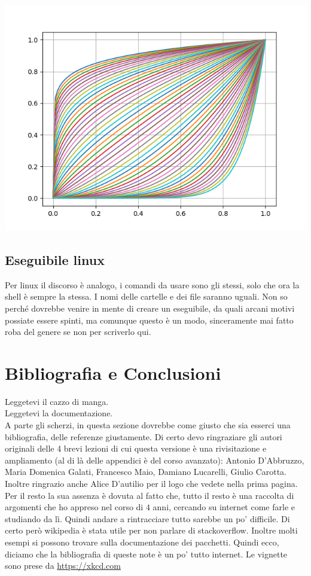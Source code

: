 \documentclass[10pt,a4paper]{article}
\begin{document}
\begin{center}
\includegraphics[scale=0.8]{img/exe_img.png}
\end{center}

\subsection{Eseguibile linux}
Per linux il discorso è analogo, i comandi da usare sono gli stessi, solo che ora la shell è sempre la stessa. I nomi delle cartelle e dei file saranno uguali. Non so perché dovrebbe venire in mente di creare un eseguibile, da quali arcani motivi possiate essere spinti, ma comunque questo è un modo, sinceramente mai fatto roba del genere se non per scriverlo qui.
\newpage


\section{Bibliografia e Conclusioni}
Leggetevi il cazzo di manga.\\
Leggetevi la documentazione.\\

A parte gli scherzi, in questa sezione dovrebbe come giusto che sia esserci una bibliografia, delle referenze giustamente. Di certo devo ringraziare gli autori originali delle 4 brevi lezioni di cui questa versione è una rivisitazione e ampliamento (al di là delle appendici è del corso avanzato): Antonio D'Abbruzzo, Maria Domenica Galati, Francesco Maio, Damiano Lucarelli, Giulio Carotta. Inoltre ringrazio anche Alice D'autilio per il logo che vedete nella prima pagina. Per il resto la sua assenza è dovuta al fatto che, tutto il resto è una raccolta di argomenti che ho appreso nel corso di $4$ anni, cercando su internet come farle e studiando da lì. Quindi andare a rintracciare tutto sarebbe un po' difficile. Di certo però wikipedia è stata utile per non parlare di stackoverflow. Inoltre molti esempi si possono trovare sulla documentazione dei pacchetti. Quindi ecco, diciamo che la bibliografia di queste note è un po' tutto internet. Le vignette sono prese da \url{https://xkcd.com}\\
\end{document}
